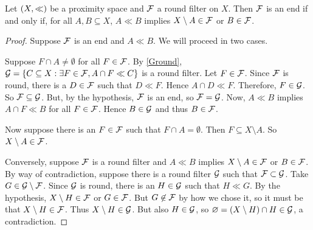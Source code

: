 \begin{theorem}
	\label{endllin}
	Let \( (X,\mathord{\ll}) \) be a proximity space and \( \mathcal{F} \) a round filter on \( X \).  Then \( \mathcal{F} \) is an end if and only if, for all \( A,B \subseteq X \), \( A \ll B \) implies \( X \setminus A \in \mathcal{F} \) or \( B \in \mathcal{F} \).
\end{theorem}
\begin{proof}
	Suppose \( \mathcal{F} \) is an end and \( A \ll B \).  We will proceed in two cases.
	
	Suppose \( F \cap A \neq \emptyset \) for all \( F \in \mathcal{F} \).  By \ref{Ground}, \( \mathcal{G} = \{ C \subseteq X : \exists F \in \mathcal{F}, A \cap F \ll C \} \) is a round filter.  Let \( F \in \mathcal{F} \).  Since \( \mathcal{F} \) is round, there is a \( D \in \mathcal{F} \) such that \( D \ll F \).  Hence \( A \cap D \ll F \).  Therefore, \( F \in \mathcal{G} \).  So \( \mathcal{F} \subseteq \mathcal{G} \).  But, by the hypothesis, \( \mathcal{F} \) is an end, so \( \mathcal{F} = \mathcal{G} \).  Now, \( A \ll B \) implies \( A \cap F \ll B \) for all \( F \in \mathcal{F} \).  Hence \( B \in \mathcal{G} \) and thus \( B \in \mathcal{F} \).
	
	Now suppose there is an \( F \in \mathcal{F} \) such that \( F \cap A = \emptyset \).  Then \( F \subseteq X \setminus A \).  So \( X \setminus A \in \mathcal{F} \).

	Conversely, suppose \( \mathcal{F} \) is a round filter and \( A \ll B \) implies \( X \setminus A \in \mathcal{F} \) or \( B \in \mathcal{F} \).  By way of contradiction, suppose there is a round filter \( \mathcal{G} \) such that \( \mathcal{F} \subset \mathcal{G} \).  Take \( G \in \mathcal{G} \setminus \mathcal{F} \).  Since \( \mathcal{G} \) is round, there is an \( H \in \mathcal{G} \) such that \( H \ll G \).  By the hypothesis, \( X \setminus H \in \mathcal{F} \) or \( G \in \mathcal{F} \).  But \( G \not\in \mathcal{F} \) by how we chose it, so it must be that \( X \setminus H \in \mathcal{F} \).  Thus \( X \setminus H \in \mathcal{G} \).  But also \( H \in \mathcal{G} \), so \( \varnothing = (X \setminus H) \cap H \in \mathcal{G} \), a contradiction.
\end{proof}

